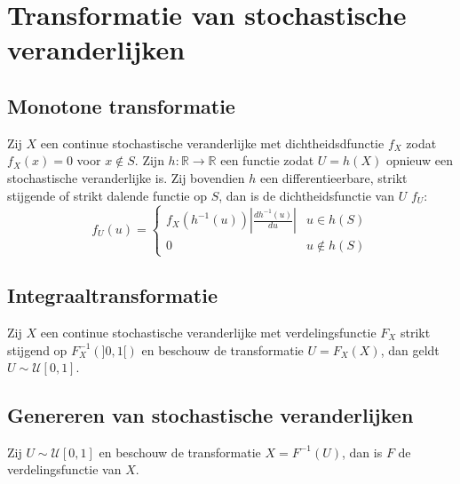 \documentclass[main.tex]{subfiles}
\begin{document}
\section{Transformatie van stochastische veranderlijken}
\label{sec:transf-van-stoch}

\subsection{Monotone transformatie}
\label{sec:monot-transf}

\begin{st}
  Zij $X$ een continue stochastische veranderlijke met dichtheidsdfunctie $f_{X}$ zodat $f_{X}(x)=0$ voor $x\not\in S$. Zijn $h: \mathbb{R} \rightarrow \mathbb{R}$ een functie zodat $U=h(X)$ opnieuw een stochastische veranderlijke is. Zij bovendien $h$ een differentieerbare, strikt stijgende of strikt dalende functie op $S$, dan is de dichtheidsfunctie van $U$ $f_{U}$:
  \[
  f_{U}(u) = 
  \left\{
    \begin{array}{ll}
      f_{X}(h^{-1}(u)) \left| \frac{dh^{-1}(u)}{du} \right|& u\in h(S)\\
      0 & u \not \in h(S)
    \end{array}
  \right.
  \]
\end{st}

\subsection{Integraaltransformatie}
\label{sec:integr}

\begin{ei}
  Zij $X$ een continue stochastische veranderlijke met verdelingsfunctie $F_{X}$ strikt stijgend op $F_{X}^{-1}(]0,1[)$ en beschouw de transformatie $U=F_{X}(X)$, dan geldt $U \sim \mathcal{U}[0,1]$.
\end{ei}

\subsection{Genereren van stochastische veranderlijken}
\label{sec:gener-van-stoch}

\begin{ei}
  Zij $U \sim \mathcal{U}[0,1]$ en beschouw de transformatie $X = F^{-1}(U)$, dan is $F$ de verdelingsfunctie van $X$.
\end{ei}
\end{document}
